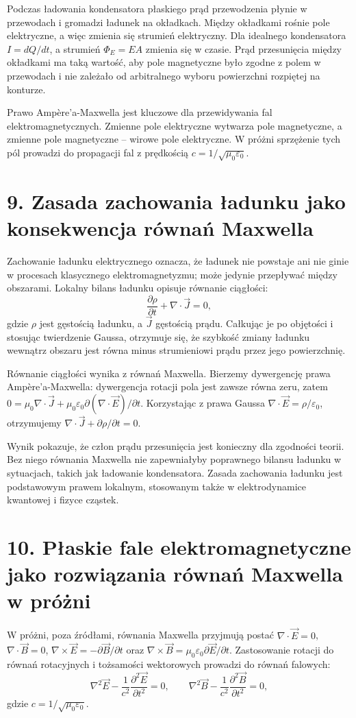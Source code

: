 \documentclass[11pt,a4paper,oneside]{report}
\begin{document}
Podczas ładowania kondensatora płaskiego prąd przewodzenia płynie w przewodach i gromadzi ładunek na okładkach. Między okładkami rośnie pole elektryczne, a więc zmienia się strumień elektryczny. Dla idealnego kondensatora \(I=dQ/dt\), a strumień \(\Phi_E=EA\) zmienia się w czasie. Prąd przesunięcia między okładkami ma taką wartość, aby pole magnetyczne było zgodne z polem w przewodach i nie zależało od arbitralnego wyboru powierzchni rozpiętej na konturze.

Prawo Ampère’a-Maxwella jest kluczowe dla przewidywania fal elektromagnetycznych. Zmienne pole elektryczne wytwarza pole magnetyczne, a zmienne pole magnetyczne – wirowe pole elektryczne. W próżni sprzężenie tych pól prowadzi do propagacji fal z prędkością \(c=1/\sqrt{\mu_0\varepsilon_0}\).

\section{9. Zasada zachowania ładunku jako konsekwencja równań Maxwella}
Zachowanie ładunku elektrycznego oznacza, że ładunek nie powstaje ani nie ginie w procesach klasycznego elektromagnetyzmu; może jedynie przepływać między obszarami. Lokalny bilans ładunku opisuje równanie ciągłości:
\[
\frac{\partial\rho}{\partial t}+\nabla\cdot\vec J=0,
\]
gdzie \(\rho\) jest gęstością ładunku, a \(\vec J\) gęstością prądu. Całkując je po objętości i stosując twierdzenie Gaussa, otrzymuje się, że szybkość zmiany ładunku wewnątrz obszaru jest równa minus strumieniowi prądu przez jego powierzchnię.

Równanie ciągłości wynika z równań Maxwella. Bierzemy dywergencję prawa Ampère’a-Maxwella: dywergencja rotacji pola jest zawsze równa zeru, zatem \(0=\mu_0\nabla\cdot\vec J+\mu_0\varepsilon_0\partial(\nabla\cdot\vec E)/\partial t\). Korzystając z prawa Gaussa \(\nabla\cdot\vec E=\rho/\varepsilon_0\), otrzymujemy \(\nabla\cdot\vec J+\partial\rho/\partial t=0\).

Wynik pokazuje, że człon prądu przesunięcia jest konieczny dla zgodności teorii. Bez niego równania Maxwella nie zapewniałyby poprawnego bilansu ładunku w sytuacjach, takich jak ładowanie kondensatora. Zasada zachowania ładunku jest podstawowym prawem lokalnym, stosowanym także w elektrodynamice kwantowej i fizyce cząstek.

\section{10. Płaskie fale elektromagnetyczne jako rozwiązania równań Maxwella w próżni}
W próżni, poza źródłami, równania Maxwella przyjmują postać \(\nabla\cdot\vec E=0\), \(\nabla\cdot\vec B=0\), \(\nabla\times\vec E=-\partial\vec B/\partial t\) oraz \(\nabla\times\vec B=\mu_0\varepsilon_0\partial\vec E/\partial t\). Zastosowanie rotacji do równań rotacyjnych i tożsamości wektorowych prowadzi do równań falowych:
\[
\nabla^2\vec E-\frac{1}{c^2}\frac{\partial^2\vec E}{\partial t^2}=0,\qquad
\nabla^2\vec B-\frac{1}{c^2}\frac{\partial^2\vec B}{\partial t^2}=0,
\]
gdzie \(c=1/\sqrt{\mu_0\varepsilon_0}\).
\end{document}
